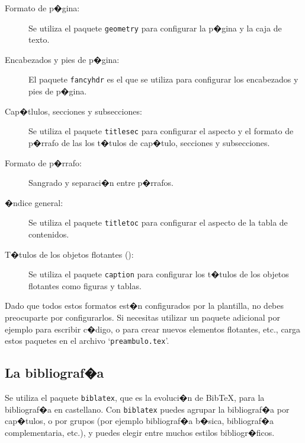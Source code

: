 \begin{description}


	\item[Formato de p�gina:] 
	Se utiliza el paquete \texttt{geometry} para configurar la p�gina y la caja de texto. 
	
	\item[Encabezados y pies de p�gina:] 
	El paquete \texttt{fancyhdr} es el que se utiliza para configurar los encabezados y pies de p�gina.
	
	\item[Cap�tlulos, secciones y subsecciones:]

	Se utiliza el paquete \texttt{titlesec} para configurar el aspecto y el formato de p�rrafo de las los t�tulos de cap�tulo, secciones y subsecciones.
	
	\item[Formato de p�rrafo:]
	Sangrado y separaci�n entre p�rrafos.

	\item[�ndice general:] 
	Se utiliza el paquete \texttt{titletoc} para configurar el aspecto de la tabla de contenidos.
	
	\item[T�tulos de los objetos flotantes ():] 
	Se utiliza el paquete \texttt{caption} para configurar los t�tulos de los objetos flotantes como figuras y tablas.	

\end{description}
 
Dado que todos estos formatos est�n configurados por la plantilla, no debes preocuparte por configurarlos. Si necesitas utilizar un paquete adicional por ejemplo para escribir c�digo, o para crear nuevos elementos flotantes, etc., carga estos paquetes en el archivo `\texttt{preambulo.tex}'.

\subsection{La bibliograf�a}
\label{sec:manual:bibliografia}

Se utiliza el paquete {\texttt{biblatex}}, que es la evoluci�n de \textrm{Bib\TeX}, para la bibliograf�a en castellano. Con \texttt{biblatex} puedes agrupar la bibliograf�a por cap�tulos, o por grupos (por ejemplo bibliograf�a b�sica, bibliograf�a complementaria, etc.), y puedes elegir entre muchos estilos bibliogr�ficos.

